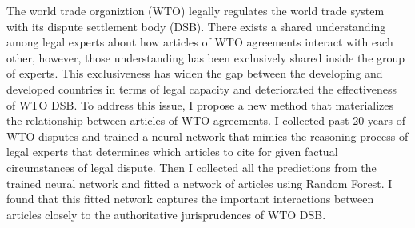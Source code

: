 The world trade organiztion (WTO) legally regulates the world trade system with its dispute settlement body (DSB).
There exists a shared understanding among legal experts about how articles of WTO agreements interact with each other, however, 
those understanding has been exclusively shared inside the group of experts.  %
This exclusiveness has widen the gap
between the developing and developed countries in terms of
legal capacity and deteriorated the effectiveness of WTO DSB.
To address this issue, I propose a new method that materializes the relationship between articles of WTO agreements. %
I collected past 20 years of WTO disputes and trained a neural network that mimics the reasoning process of legal experts that determines which articles to cite for given factual circumstances of legal dispute.
Then I collected all the predictions from the trained neural network and fitted a network of articles using Random Forest.
I found that this fitted network captures the important interactions between articles closely to the authoritative jurisprudences of WTO DSB.